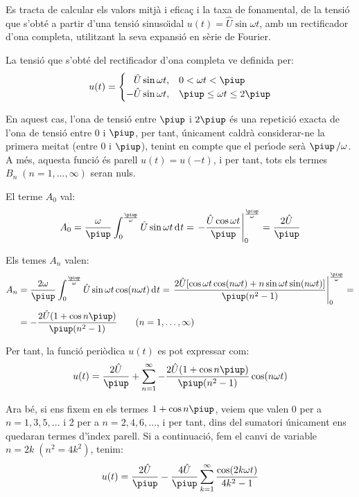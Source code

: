 \begin{exemple}
Es tracta de calcular els valors mitj\`{a} i efica\c{c} i la taxa de
fonamental, de la tensi\'{o} que s'obt\'{e} a partir d'una tensi\'{o}
sinuso\"{\i}dal $u(t) = \hat{U} \sin\omega t$, amb un rectificador d'ona
completa, utilitzant la seva expansi\'{o} en s\`{e}rie de Fourier.

La tensi\'{o} que s'obt\'{e} del rectificador d'ona completa ve definida
per:
\[
u(t) = \begin{cases} \phantom{-}\hat{U} \sin\omega t, & 0 < \omega t < \piup\\
       -\hat{U} \sin\omega t, & \piup \leq \omega t \leq 2\piup \end{cases}
\]

En aquest cas, l'ona de tensi\'{o} entre $\piup$ i $2\piup$ \'{e}s una repetici\'{o}
exacta de l'ona de tensi\'{o} entre 0 i $\piup$, per tant, \'{u}nicament
caldr\`{a} considerar-ne la primera meitat (entre 0 i $\piup$), tenint en
compte que el per\'{\i}ode ser\`{a} $\piup\,/\omega$. A m\'{e}s, aquesta funci\'{o} \'{e}s
parell $u(t) = u(-t)$, i per tant, tots els termes
$B_n\;(n=1,\ldots,\infty)$ seran nuls.

El terme $A_0$ val:
\[
A_0 = \frac{\omega}{\piup} \int_0^{\frac{\piup}{\omega}} \hat{U} \sin
\omega t \diff t = \left. -\frac{\hat{U} \cos \omega t}{\piup}
\right|_0^{\frac{\piup}{\omega}} = \frac{2\hat{U}}{\piup}
\]

Els temes $A_n$ valen:
\[
\begin{split}
A_n &= \frac{2 \omega}{\piup} \int_0^{\frac{\piup}{\omega}} \hat{U} \sin
\omega t \cos(n \omega t)\diff t = \left. \frac{2 \hat{U}[ \cos
\omega t \cos (n \omega t) + n \sin \omega t \sin(n \omega
t)]}{\piup(n^2-1)} \right|_0^{\frac{\piup}{\omega}}=\\[0.5ex]
&= -\frac{2\hat{U}(1+\cos n \piup)}{\piup(n^2-1)}
\qquad(n=1,\ldots,\infty)
\end{split}
\]

Per tant, la funci\'{o} peri\`{o}dica $u(t)$ es pot expressar com:
\[
    u(t) = \frac{2\hat{U}}{\piup} + \sum_{n=1}^\infty
     -\frac{2\hat{U}(1+\cos n \piup)}{\piup(n^2-1)} \cos(n \omega t)
\]

Ara b\'{e}, si ens fixem en els termes $1+\cos n \piup$, veiem que valen 0
per a $n=1,3,5,\ldots$ i 2 per a $n=2,4,6,\ldots$, i per tant, dins
del sumatori \'{u}nicament ens quedaran termes d'\'{\i}ndex parell. Si a
continuaci\'{o}, fem el canvi de variable $n=2k\;(n^2=4k^2)$, tenim:
\[
u(t) = \frac{2\hat{U}}{\piup} - \frac{4\hat{U}}{\piup} \sum_{k=1}^\infty
      \frac{\cos(2 k \omega t)}{4k^2-1}
\]


\end{exemple}
